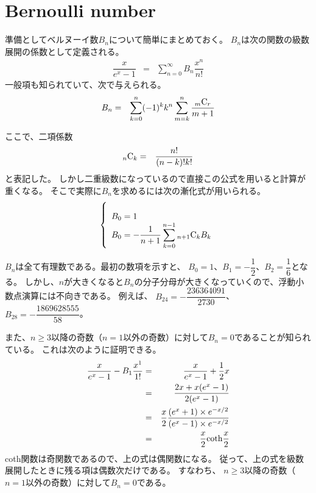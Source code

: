 \documentclass[uplatex,a4j,12pt,dvipdfmx]{jsarticle}
\begin{document}
\section{Bernoulli number}

準備としてベルヌーイ数$B_{n}$について簡単にまとめておく。
$B_{n}$は次の関数の級数展開の係数として定義される。
\begin{eqnarray}
	\dfrac{x}{e^{x}-1}
	&=&
	\sum_{n=0}^{\infty}
	B_{n}
	\dfrac{x^{n}}{n!}
\end{eqnarray}
一般項も知られていて、次で与えられる。
\begin{eqnarray}
	B_{n}
	&=&
	\sum_{k=0}^{n}
	(-1)^{k}
	k^{n}
	\sum_{m=k}^{n}
	\dfrac{{_{m}}{\rm C}_{r}}{m+1}
\end{eqnarray}




ここで、二項係数
\begin{eqnarray}
	{_{n}}{\rm C}_{k}
	&=&
	\dfrac{n!}{(n-k)!k!}
\end{eqnarray}
と表記した。
しかし二重級数になっているので直接この公式を用いると計算が重くなる。
そこで実際に$B_{n}$を求めるには次の漸化式が用いられる。
\begin{eqnarray}
	\left\{
	\begin{array}{l}
		\\
		B_{0} = 1 \\
		B_{0} = -\dfrac{1}{n+1} \displaystyle \sum_{k=0}^{n-1} {_{n+1}}{\rm C}_{k} B_{k}
	\end{array}
	\right.
\end{eqnarray}

$B_{n}$は全て有理数である。最初の数項を示すと、
$B_{0}=1$、$B_{1}=-\dfrac{1}{2}$、$B_{2}=\dfrac{1}{6}$となる。
しかし、$n$が大きくなると$B_{n}$の分子分母が大きくなっていくので、浮動小数点演算には不向きである。
例えば、
$B_{24}=-\dfrac{236364091}{2730}$、
$B_{28}=-\dfrac{1869628555}{58}$。

また、$n \geq 3$以降の奇数（$n=1$以外の奇数）に対して$B_{n}=0$であることが知られている。
これは次のように証明できる。
\begin{eqnarray}
	\dfrac{x}{e^{x}-1}
	-
	B_{1}
	\dfrac{x^{1}}{1!}
	&=&
	\dfrac{x}{e^{x}-1}
	+
	\dfrac{1}{2}x
	\nonumber \\ &=&
	\dfrac{2x + x(e^{x} -1)}{2(e^{x}-1)}
	\nonumber \\ &=&
	\dfrac{x}{2}
	\dfrac{(e^{x} +1) \times e^{-x/2}}{(e^{x}-1)\times e^{-x/2}}
	\nonumber \\ &=&
	\dfrac{x}{2}
	{\rm coth}\dfrac{x}{2}
\end{eqnarray}
{\rm coth}関数は奇関数であるので、上の式は偶関数になる。
従って、上の式を級数展開したときに残る項は偶数次だけである。
すなわち、
$n \geq 3$以降の奇数（$n=1$以外の奇数）に対して$B_{n}=0$である。
\end{document}
